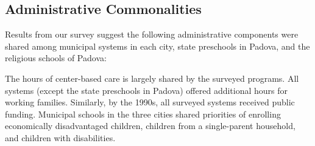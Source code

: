 \subsection{Administrative Commonalities}

Results from our survey suggest the following administrative components were shared among municipal systems in each city, state preschools in Padova, and the religious schools of Padova: 

The hours of center-based care is largely shared by the surveyed programs. All systems (except the state preschools in Padova) offered additional hours for working families. Similarly, by the 1990s, all surveyed systems received public funding. Municipal schools in the three cities shared priorities of enrolling economically disadvantaged children, children from a single-parent household, and children with disabilities. 
 

 

